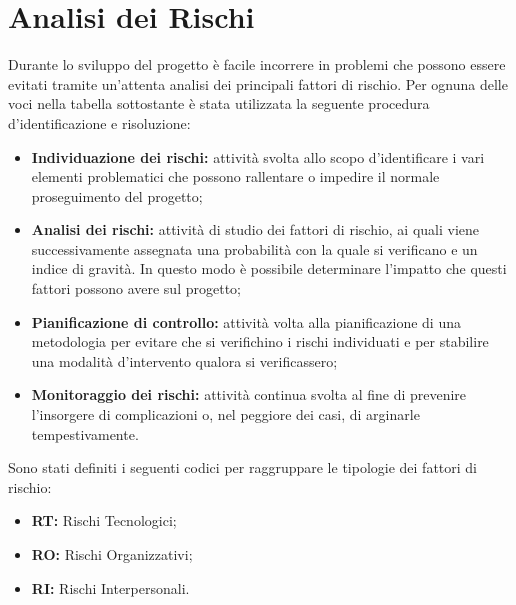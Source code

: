 \section{Analisi dei Rischi}
Durante lo sviluppo del progetto è facile incorrere in problemi che possono essere evitati tramite un'attenta analisi dei principali fattori di rischio.
Per ognuna delle voci nella tabella sottostante è stata utilizzata la seguente procedura d'identificazione e risoluzione:

\begin{itemize}
    \item \textbf{Individuazione dei rischi: }attività svolta allo scopo d'identificare i vari elementi problematici che possono rallentare o impedire il normale proseguimento del progetto;
    \item \textbf{Analisi dei rischi: }attività di studio dei fattori di rischio, ai quali viene successivamente assegnata una probabilità con la quale si verificano e un indice di gravità. In questo modo è possibile determinare l'impatto che questi fattori possono avere sul progetto;
    \item \textbf{Pianificazione di controllo: } attività volta alla pianificazione di una metodologia per evitare che si verifichino i rischi individuati e per stabilire una modalità d'intervento qualora si verificassero;
    \item \textbf{Monitoraggio dei rischi: }attività continua svolta al fine di prevenire l'insorgere di complicazioni o, nel peggiore dei casi, di arginarle tempestivamente.
\end{itemize}

Sono stati definiti i seguenti codici per raggruppare le tipologie dei fattori di rischio:
\begin{itemize}
    \item \textbf{RT: }Rischi Tecnologici;
    \item \textbf{RO: }Rischi Organizzativi;
    \item \textbf{RI: }Rischi Interpersonali.
\end{itemize}

